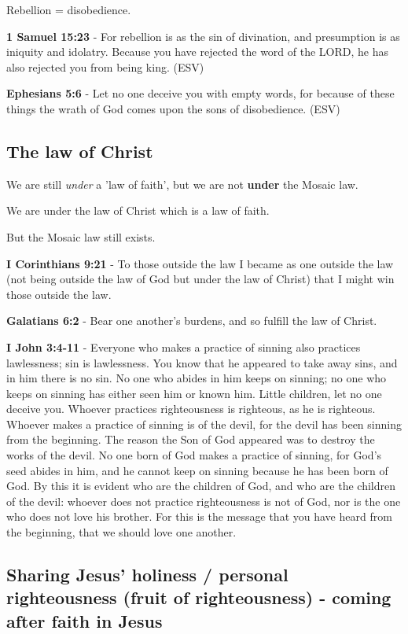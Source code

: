 \documentclass[11pt]{article}
\begin{document}
Rebellion = disobedience.

\textbf{1 Samuel 15:23} - For rebellion is as the sin of divination, and presumption is as iniquity and idolatry. Because you have rejected the word of the LORD, he has also rejected you from being king. (ESV)

\textbf{Ephesians 5:6} - Let no one deceive you with empty words, for because of these things the wrath of God comes upon the sons of disobedience. (ESV)

\subsection{The law of Christ}
\label{sec:org0d5fcf2}
We are still \emph{under} a 'law of faith', but we are not \textbf{under} the Mosaic law.

We are under the law of Christ which is a law of faith.

But the Mosaic law still exists.

\textbf{I Corinthians 9:21} - To those outside the law I became as one outside the law (not being outside the law of God but under the law of Christ) that I might win those outside the law.

\textbf{Galatians 6:2} - Bear one another's burdens, and so fulfill the law of Christ.

\textbf{I John 3:4-11} - Everyone who makes a practice of sinning also practices lawlessness; sin is lawlessness. You know that he appeared to take away sins, and in him there is no sin. No one who abides in him keeps on sinning; no one who keeps on sinning has either seen him or known him. Little children, let no one deceive you. Whoever practices righteousness is righteous, as he is righteous. Whoever makes a practice of sinning is of the devil, for the devil has been sinning from the beginning. The reason the Son of God appeared was to destroy the works of the devil. No one born of God makes a practice of sinning, for God's seed abides in him, and he cannot keep on sinning because he has been born of God. By this it is evident who are the children of God, and who are the children of the devil: whoever does not practice righteousness is not of God, nor is the one who does not love his brother. For this is the message that you have heard from the beginning, that we should love one another.

\subsection{Sharing Jesus' holiness / personal righteousness (fruit of righteousness) - coming \textbf{after} faith in Jesus}
\label{sec:org2c99393}
\end{document}
